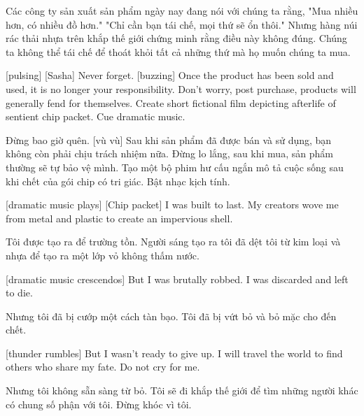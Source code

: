\documentclass[a4paper]{article}
\begin{document}
	\begin{vietnamese-v2}
		[Jan] Các công ty sản xuất sản phẩm ngày nay đang nói với chúng ta rằng,
		"Mua nhiều hơn, có nhiều đồ hơn."
		"Chỉ cần bạn tái chế, mọi thứ sẽ ổn thôi."
		Nhưng hàng núi rác thải nhựa trên khắp thế giới chứng minh rằng điều này không đúng.
		Chúng ta không thể tái chế để thoát khỏi tất cả những thứ mà họ muốn chúng ta mua.
	\end{vietnamese-v2}
	
	
	[pulsing]
	[Sasha] Never forget.
	[buzzing]
	Once the product has been sold and used, it is no longer your responsibility.
	Don't worry, post purchase, products will generally fend for themselves.
	Create short fictional film depicting afterlife of sentient chip packet.
	Cue dramatic music.
	
	\begin{vietnamese-v2}
		[đập]
		[Sasha] Đừng bao giờ quên.
		[vù vù]
		Sau khi sản phẩm đã được bán và sử dụng, bạn không còn phải chịu trách nhiệm nữa.
		Đừng lo lắng, sau khi mua, sản phẩm thường sẽ tự bảo vệ mình.
		Tạo một bộ phim hư cấu ngắn mô tả cuộc sống sau khi chết của gói chip có tri giác.
		Bật nhạc kịch tính.
	\end{vietnamese-v2}
	
	[dramatic music plays]
	[Chip packet] I was built to last.
	My creators wove me from metal and plastic to create an impervious shell.
	
	\begin{vietnamese-v2}
		 Tôi được tạo ra để trường tồn.
		Người sáng tạo ra tôi đã dệt tôi từ kim loại và nhựa để tạo ra một lớp vỏ không thấm nước.
	\end{vietnamese-v2}
	
	[dramatic music crescendos]
	But I was brutally robbed.
	I was discarded and left to die.
	
	\begin{vietnamese-v2}
		Nhưng tôi đã bị cướp một cách tàn bạo.
		Tôi đã bị vứt bỏ và bỏ mặc cho đến chết.
	\end{vietnamese-v2}
	
	[thunder rumbles]
	But I wasn't ready to give up.
	I will travel the world
	to find others who share my fate.
	Do not cry for me.
	
	\begin{vietnamese-v2}
		Nhưng tôi không sẵn sàng từ bỏ.
		Tôi sẽ đi khắp thế giới
		để tìm những người khác có chung số phận với tôi.
		Đừng khóc vì tôi.
	\end{vietnamese-v2}
	
\end{document}
